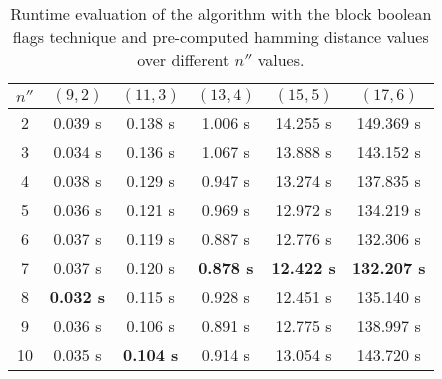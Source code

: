 \begin{table}[h] %
	\renewcommand{\arraystretch}{1.3}
	\label{tbl:nprime-prime-start-value}
	\centering
	\begin{tabular}{|c|c|c|c|c|c|}
		\hline 
		\bfseries\boldmath $n''$ & 
		\bfseries\boldmath $(9,2)$ & 
		\bfseries\boldmath $(11,3)$ & 
		\bfseries\boldmath $(13,4)$ & 
		\bfseries\boldmath $(15,5)$ & 
		\bfseries\boldmath $(17,6)$ \\
		\hline
			2	& 0.039	s & 0.138 s & 1.006	s & 14.255 s &	149.369 s\\
			3	& 0.034	s & 0.136 s & 1.067	s & 13.888 s &	143.152 s\\
			4	& 0.038	s & 0.129 s & 0.947	s & 13.274 s &	137.835 s\\
			5	& 0.036	s & 0.121 s & 0.969	s & 12.972 s &	134.219 s\\
			6	& 0.037	s & 0.119 s & 0.887	s & 12.776 s &	132.306 s\\
			7	& 0.037	s & 0.120 s & \textbf{0.878	s} & \textbf{12.422 s} &	\textbf{132.207 s}\\
			8	& \textbf{0.032	s} & 0.115 s & 0.928	s & 12.451 s &	135.140 s\\
			9	& 0.036	s & 0.106 s	& 0.891	s & 12.775 s &	138.997 s\\
			10	& 0.035	s & \textbf{0.104 s}	& 0.914 s &	13.054 s &	143.720 s\\
		\hline\end{tabular}
	\caption{Runtime evaluation of the algorithm with the block boolean flags technique and pre-computed hamming distance values over different $n''$ values.}
\end{table}